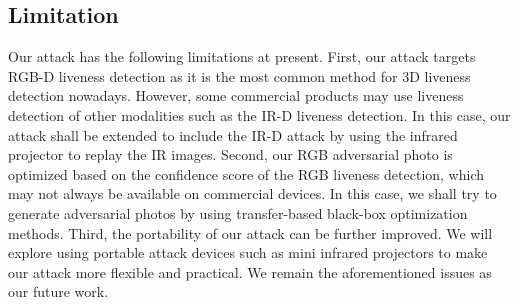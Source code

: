 

\subsection{Limitation}
Our attack has the following limitations at present. 
First, our attack targets RGB-D  liveness detection as it is the most common method for 3D liveness detection nowadays. However, some commercial products may use liveness detection of other modalities such as the IR-D liveness detection. In this case, our attack shall be extended to include the IR-D attack by using the infrared projector to replay the IR images.
Second, our RGB adversarial photo is optimized based on the confidence score of the RGB liveness detection, which may not always be available on commercial devices. In this case, we shall try to generate adversarial photos by using transfer-based black-box optimization methods.
Third, the portability of our attack can be further improved. We will explore using portable attack devices such as mini infrared projectors to make our attack more flexible and practical. We remain the aforementioned issues as our future work.

